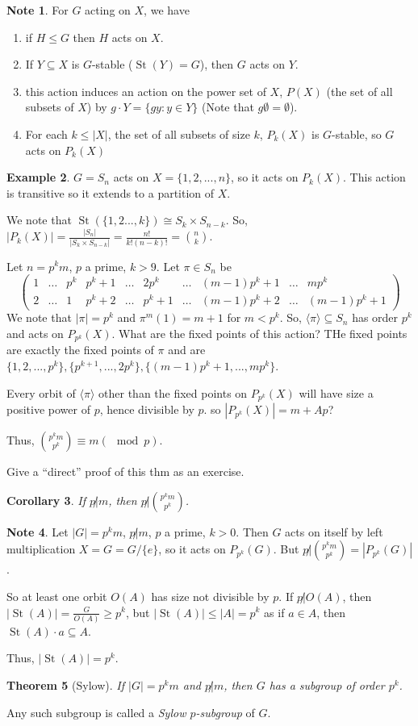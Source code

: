 \documentclass{amsart}
\newtheorem{thm}{Theorem}[section]
\newtheorem{cor}[thm]{Corollary}
\theoremstyle{definition}
\newtheorem{example}[thm]{Example}
\newtheorem{note}[thm]{Note}
\DeclareMathOperator{\St}{St}
\begin{document}
\begin{note}
	For $G$ acting on $X$, we have
	\begin{enumerate}
		\item if $H\leq G$ then $H$ acts on $X$.
		\item If $Y\subseteq X$ is $G$-stable ($\St(Y)=G$), then $G$ acts on $Y$.
		\item this action induces an action on the power set of $X$, $P(X)$ (the set of all subsets of $X$) by $g\cdot Y=\{gy:y\in Y\}$ (Note that $g\emptyset=\emptyset$).
		\item For each $k\leq |X|$, the set of all subsets of size $k$, $P_k(X)$ is $G$-stable, so $G$ acts on $P_k(X)$
	\end{enumerate}
\end{note}
\begin{example}
	$G=S_n$ acts on $X=\{1,2,...,n\}$, so it acts on $P_k(X)$. This action is transitive so it extends to a partition of $X$.
	
	We note that $\St(\{1,2...,k\})\cong S_k\times S_{n-k}$. So, $|P_k(X)|=\frac{|S_n|}{|S_k\times S_{n-k}|}=\frac{n!}{k!(n-k)!}=\binom{n}{k}$.
\end{example}
Let $n=p^km$, $p$ a prime, $k>9$. Let $\pi\in S_n$ be 
$$\begin{pmatrix}
	1&\dots&p^k&p^k+1&\dots&2p^k & \dots &(m-1)p^k+1&\dots&mp^k\\
	2&\dots &1&p^k+2&\dots &p^k+1&\dots &(m-1)p^k+2&\dots&(m-1)p^k+1
	
\end{pmatrix}$$
We note that $|\pi|=p^k$ and $\pi^m(1)=m+1$ for $m<p^k$. So, $\langle \pi\rangle\subseteq S_n$ has order $p^k$ and acts on $P_{p^k}(X)$.  What are the fixed points of this action? THe fixed points are exactly the fixed points of $\pi$ and are $\{1,2,...,p^k\}, \{p^{k+1},...,2p^k\},\{(m-1)p^k+1,...,mp^k\}$.

Every orbit of $\langle \pi\rangle $ other than the fixed points on $P_{p^{k}}(X)$ will have size a positive power of $p$, hence divisible by $p$. so $|P_{p^k}(X)|=m+Ap$?

Thus, $\binom{p^km}{p^k}\equiv m(\mod p)$.

Give a ``direct'' proof of this thm as an exercise.
\begin{cor}
	If $p\not|m$, then $p\not| \binom{p^km}{p^k}$.
\end{cor}
\begin{note}
	Let $|G|=p^km$, $p\not|m$, $p$ a prime, $k>0$. Then $G$ acts on itself by left multiplication $X=G=G/\{e\}$, so it acts on $P_{p^k}(G)$. But $p\not| \binom{p^km}{p^k}=|P_{p^k}(G)|$.
	
	So at least one orbit $O(A)$ has size not divisible by $p$. If $p\not|O(A)$, then $|\St(A)|=\frac{G}{O(A)}\geq p^k$, but $|\St(A)|\leq |A|=p^k$ as if $a\in A$, then $\St(A)\cdot a\subseteq A$.
	
	Thus, $|\St(A)|=p^k$.
\end{note}
\begin{thm}[Sylow]
	If $|G|=p^km$ and $p\not|m$, then $G$ has a subgroup of order $p^k$.
\end{thm}
Any such subgroup is called a \emph{Sylow $p$-subgroup} of $G$.
\end{document}
